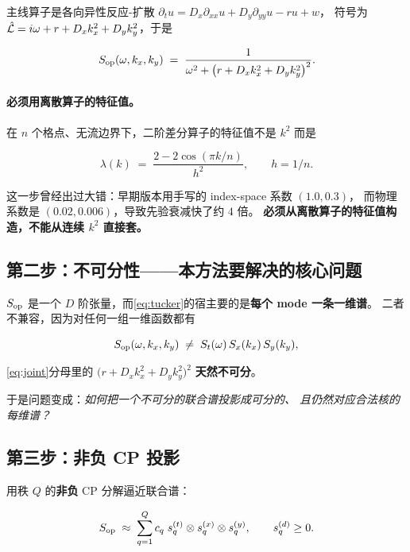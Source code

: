 \documentclass[11pt,a4paper]{article}
\begin{document}
主线算子是各向异性反应-扩散
$\partial_t u = D_x \partial_{xx} u + D_y \partial_{yy} u - r u + w$，
符号为 $\hat{\mathcal{L}} = i\omega + r + D_x k_x^2 + D_y k_y^2$，于是

\begin{equation}
S_{\mathrm{op}}(\omega, k_x, k_y) \;=\; \frac{1}{\omega^2 + \bigl(r + D_x k_x^2 + D_y k_y^2\bigr)^2}.
\label{eq:joint}
\end{equation}

\paragraph{必须用离散算子的特征值。}
在 $n$ 个格点、无流边界下，二阶差分算子的特征值不是 $k^2$ 而是

\begin{equation}
\lambda(k) \;=\; \frac{2 - 2\cos(\pi k / n)}{h^2}, \qquad h = 1/n .
\label{eq:eig}
\end{equation}

这一步曾经出过大错：早期版本用手写的 index-space 系数 $(1.0, 0.3)$，
而物理系数是 $(0.02, 0.006)$，导致先验衰减快了约 $4$ 倍。
\textbf{必须从离散算子的特征值构造，不能从连续 $k^2$ 直接套。}

\subsection{第二步：不可分性——本方法要解决的核心问题}

$S_{\mathrm{op}}$ 是一个 $D$ 阶张量，而\cref{eq:tucker}的宿主要的是\textbf{每个 mode 一条一维谱}。
二者不兼容，因为对任何一组一维函数都有

\begin{equation}
S_{\mathrm{op}}(\omega, k_x, k_y) \;\neq\; S_t(\omega)\, S_x(k_x)\, S_y(k_y),
\end{equation}

\cref{eq:joint}分母里的 $\bigl(r + D_x k_x^2 + D_y k_y^2\bigr)^2$ \textbf{天然不可分}。

于是问题变成：\emph{如何把一个不可分的联合谱投影成可分的、
且仍然对应合法核的每维谱？}

\subsection{第三步：非负 CP 投影}

用秩 $Q$ 的\textbf{非负} CP 分解逼近联合谱：

\begin{equation}
S_{\mathrm{op}} \;\approx\; \sum_{q=1}^{Q} c_q \; s^{(t)}_q \otimes s^{(x)}_q \otimes s^{(y)}_q,
\qquad s^{(d)}_q \ge 0 .
\label{eq:cp}
\end{equation}
\end{document}
